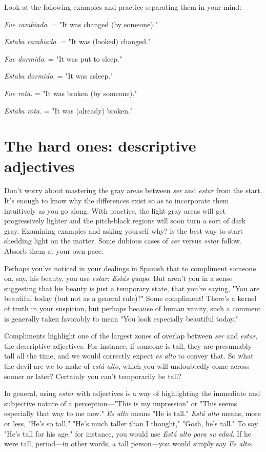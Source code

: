 \documentclass[14pt,a4paper,oneside]{memoir}
\newcommand{\bsk}{\vspace{20pt}}
\newcommand{\indu}{\hspace{20pt}}
\begin{document}
Look at the following examples and practice separating them
in your mind:

\bsk

\indu \emph{Fue cambiado}. = "It was changed (by someone)."

\indu \emph{Estaba cambiado}. = "It was (looked) changed." 

\indu \emph{Fue dormido}. = "It was put to sleep."

\indu \emph{Estaba dormido}. = "It was asleep."

\indu \emph{Fue rota}. = "It was broken (by someone)."

\indu \emph{Estaba rota}. = "It was (already) broken."

\section{The hard ones: descriptive adjectives}

Don't worry about mastering the gray areas between \emph{ser} and
\emph{estar} from the start. It's enough to know why the differences exist so
as to incorporate them intuitively as you go along. With practice, the
light gray areas will get progressively lighter and the pitch-black regions will soon turn a sort of dark gray. Examining examples and asking yourself why? is the best way to start shedding light on the matter.
Some dubious cases of \emph{ser} versus \emph{estar} follow. Absorb them at your
own pace.

Perhaps you've noticed in your dealings in Spanish that to compliment someone on, say, his beauty, you use \emph{estar}: \emph{Estás guapo}. But
aren't you in a sense suggesting that his beauty is just a temporary
state, that you're saying, "You are beautiful today (but not as a general
rule)?" Some compliment! There's a kernel of truth in your suspicion,
but perhaps because of human vanity, such a comment is generally
taken favorably to mean "You look especially beautiful today."

Compliments highlight one of the largest zones of overlap between \emph{ser} and \emph{estar}, the descriptive adjectives. For instance, if someone is tall, they are presumably tall all the time, and we would correctly expect \emph{es alto} to convey that. So what the devil are we to make
of \emph{está alto}, which you will undoubtedly come across sooner or later?
Certainly you can't temporarily be tall?

In general, using \emph{estar} with adjectives is a way of highlighting
the immediate and subjective nature of a perception---"This is my
impression" or "This seems especially that way to me now." \emph{Es alto}
means "He is tall." \emph{Está alto} means, more or less, "He's so tall," "He's
much taller than I thought," "Gosh, he's tall." To say "He's tall for his
age," for instance, you would use \emph{Está alto para su edad}. If he were
tall, period---in other words, a tall person---you would simply say
\emph{Es alto}.
\end{document}
